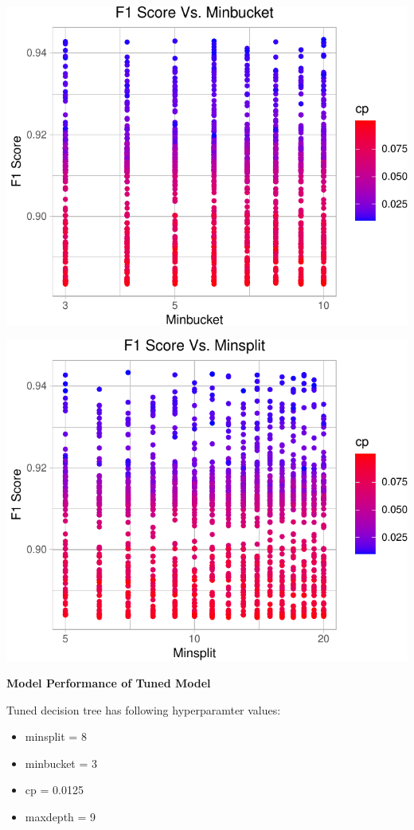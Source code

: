 \documentclass[
]{article}
\providecommand{\tightlist}{%
  \setlength{\itemsep}{0pt}\setlength{\parskip}{0pt}}
\begin{document}
\begin{center}\includegraphics{case_study03_files/figure-latex/unnamed-chunk-24-1} \end{center}

\begin{center}\includegraphics{case_study03_files/figure-latex/unnamed-chunk-25-1} \end{center}

\textbf{Model Performance of Tuned Model}

Tuned decision tree has following hyperparamter values:

\begin{itemize}
\tightlist
\item
  minsplit = 8
\item
  minbucket = 3
\item
  cp = 0.0125
\item
  maxdepth = 9
\end{itemize}
\end{document}
